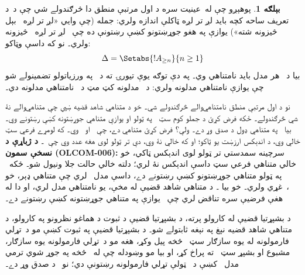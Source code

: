 \documentclass[12pt,a4paper,oneside]{report}
\newcommand{\olfileid}[3]{\gdef\pspart{#1}\gdef\pschapter{#2}\gdef\pssection{#3}}
\gdef\pspart{#2}\gdef\pschapter{#3}\gdef\pssection{}%
\theoremstyle{definition}
\newtheorem{ex}[thm]{بېلګه}
\begin{document}
\label{olpseg:OLP-0135-B016:start}

\begin{ex}
پوهېږو چې له~عينيت سره د اول مرتبې منطق دا څرګندولے شي چې
د~د تعريف ساحه کچه بايد لږ تر لږه ټاکلې اندازه ولري: جمله
 (چې وايي «لږ تر لږه~ بېل څيزونه شته») يوازې په
هغو جوړښتونو کښې رښتونې ده چې~ لږ تر لږه~ څيزونه
ولري۔ نو که داسې وټاکو:
  \[
  \Delta = \Setabs{!A_{\ge n}}{n \ge 1}
  \]
بيا د~\LR{$\Delta$} هر مدل بايد نامتناهي وي۔ په دې توګه يوې تيورۍ ته
د~\LR{$\Delta$} په ورزياتولو تضمينولے شو چې يوازې نامتناهي مدلونه
ولري: د~\LR{$\Gamma \cup \Delta$} مدلونه کټ مټ د~\LR{$\Gamma$} نامتناهي
مدلونه دي۔
\label{olpseg:OLP-0135-B016:end}

\label{olpseg:OLP-0135-B017:start}
نو د اول مرتبې منطق نامتناهي‌والے څرګندولے شي۔ خو د متناهي شاهد
قضيه ښيي چې متناهي‌والے نۀ شي څرګندولے۔ ځکه فرض کړئ د جملو کوم
سټ~\LR{$\Lambda$} په ټولو او يوازې متناهي جوړښتونه کښې رښتونے
وي۔ بيا~\LR{$\Delta \cup \Lambda$} په متناهي ډول د صدق وړ دے۔ ولې؟
فرض کړئ
 متناهي دے،
چې~ او~ وي۔
که لومړے فرعي سټ خالي وي، د اندېکس ارزښت يو ټاکو؛ او که خالي نۀ وي،
 دې تر ټولو لوی هغه عدد وي چې~۔
\textbf{د ژباړې د نسخې سمون (OLCOM-006):} سرچينه سمدستي تر ټولو
لوی اندېکس ټاکي، خو خالي متناهي فرعي سټ داسې اندېکس نۀ لري؛ دلته
خالي حالت جلا ونيول شو۔ ځکه~\LR{$\Lambda$} په ټولو متناهي جوړښتونو کښې
رښتونے دے، داسې مدل~ لري چې متناهي ډېر، خو
،~غړي ولري۔ خو بيا
۔ د متناهي شاهد قضيې له مخې،
\LR{$\Delta \cup \Lambda$} يو نامتناهي مدل لري، او دا له هغې فرضيې سره
تناقض لري چې~\LR{$\Lambda$} يوازې په متناهي جوړښتونه کښې رښتونے
دے۔
\end{ex}

\label{olpseg:OLP-0135-B017:end}

\label{olpseg:OLP-0136-B004:start}
\olfileid{fol}{com}{cpd}
\label{olpseg:OLP-0136-B004:end}

\label{olpseg:OLP-0136-B005:start}
\label{olpseg:OLP-0136-B005:end}

\label{olpseg:OLP-0136-B006:start}
د بشپړتيا قضيې له کارولو پرته، د بشپړتيا قضيې د ثبوت د هماغو
نظرونو په کارولو، د متناهي شاهد قضيه نېغ په نېغه ثابتولے شو۔ د
بشپړتيا قضيې په ثبوت کښې مو د~تړلي فارمولونه له يوه سازګار
سټ~\LR{$\Gamma$} څخه پيل وکړ، هغه مو د~تړلي فارمولونه يوه
سازګار، مشبوع او بشپړ سټ~\LR{$\Gamma^*$} ته
پراخ کړ، او بيا مو وښودله چې له~\LR{$\Gamma^*$} څخه په جوړ شوي
ترمي
  مدل~
کښې د~\LR{$\Gamma$} ټولې تړلي فارمولونه رښتونې دي؛ نو~\LR{$\Gamma$} د صدق وړ دے۔
\label{olpseg:OLP-0136-B006:end}
\end{document}
